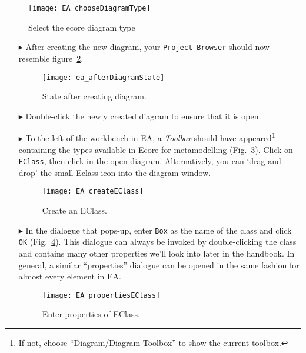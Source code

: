 \pagebreak

\begin{figure}[htbp]
	\centering
  \texttt{[image: EA\_chooseDiagramType]}
	\caption{Select the ecore diagram type}
	\label{fig:diagram_type}
\end{figure}
\FloatBarrier

\begin{itemize}
 
\item[$\blacktriangleright$] After creating the new diagram, your  \texttt{Project Browser} should now resemble figure~\ref{fig:diagram_completed}.

\begin{figure}[htbp]
	\centering
  \texttt{[image: ea\_afterDiagramState]}
	\caption{State after creating diagram.}
	\label{fig:diagram_completed}
\end{figure}


\item[$\blacktriangleright$] Double-click the newly created diagram to ensure that it is open.


\item[$\blacktriangleright$] To the left of the workbench in EA, a \emph{Toolbox} should have appeared\footnote{If not, choose ``Diagram/Diagram Toolbox'' to show the current toolbox.} containing the types available in Ecore for metamodelling (Fig.~\ref{fig:eclass}). Click on \texttt{EClass}, then click in the open diagram. Alternatively, you can `drag-and-drop' the small Eclass icon into the diagram window.

\begin{figure}[htbp]
	\centering
  \texttt{[image: EA\_createEClass]}
	\caption{Create an EClass.}
	\label{fig:eclass}
\end{figure}



\item[$\blacktriangleright$] In the dialogue that pops-up, enter \texttt{Box} as the name of the class and click \texttt{OK} (Fig.~\ref{fig:eclass_properties}).
This dialogue can always be invoked by double-clicking the class and contains many other properties we'll look into later in the handbook.
In general, a similar ``properties'' dialogue can be opened in the same fashion for almost every element in EA.

\begin{figure}[htbp]
	\centering
  \texttt{[image: EA\_propertiesEClass]}
	\caption{Enter properties of EClass.}
	\label{fig:eclass_properties}
\end{figure}


\end{itemize}
